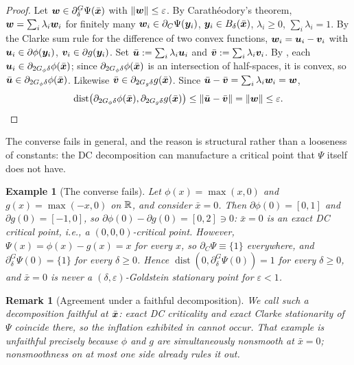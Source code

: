 \documentclass[english]{article}
\newtheorem{example}{Example}[section]
\newtheorem{remark}{Remark}[section]
\begin{document}
\begin{proof}
Let $\bm{w}\in\partial_\delta^G\Psi(\bar{\bm{x}})$ with $\|\bm{w}\|\le\varepsilon$. By
Carath\'eodory's theorem, $\bm{w}=\sum_i\lambda_i\bm{w}_i$ for finitely many
$\bm{w}_i\in\partial_C\Psi(\bm{y}_i)$, $\bm{y}_i\in B_\delta(\bar{\bm{x}})$,
$\lambda_i\ge0$, $\sum_i\lambda_i=1$. By the Clarke sum rule for the
difference of two convex functions, $\bm{w}_i=\bm{u}_i-\bm{v}_i$ with
$\bm{u}_i\in\partial\phi(\bm{y}_i)$, $\bm{v}_i\in\partial g(\bm{y}_i)$. Set
$\bar{\bm{u}}:=\sum_i\lambda_i\bm{u}_i$ and $\bar{\bm{v}}:=\sum_i\lambda_i\bm{v}_i$. By
, each $\bm{u}_i\in\partial_{2G_\phi\delta}\phi(\bar{\bm{x}})$;
since $\partial_{2G_\phi\delta}\phi(\bar{\bm{x}})$ is an intersection of
half-spaces, it is convex, so $\bar{\bm{u}}\in\partial_{2G_\phi\delta}\phi(\bar{\bm{x}})$.
Likewise $\bar{\bm{v}}\in\partial_{2G_g\delta}g(\bar{\bm{x}})$. Since
$\bar{\bm{u}}-\bar{\bm{v}}=\sum_i\lambda_i\bm{w}_i=\bm{w}$,
\[
    \operatorname{dist}\bigl(\partial_{2G_\phi\delta}\phi(\bar{\bm{x}}),\partial_{2G_g\delta}g(\bar{\bm{x}})\bigr)
    \le\|\bar{\bm{u}}-\bar{\bm{v}}\|=\|\bm{w}\|\le\varepsilon.
    \qedhere
\]
\end{proof}

The converse fails in general, and the reason is structural rather than a
looseness of constants: the DC decomposition can manufacture a critical
point that $\Psi$ itself does not have.

\begin{example}[The converse fails]
\label{ex:goldstein-counterexample}
Let $\phi(x)=\max\limits(x,0)$ and $g(x)=\max\limits(-x,0)$ on $\mathbb{R}$, and consider
$\bar x=0$. Then $\partial\phi(0)=[0,1]$ and $\partial g(0)=[-1,0]$, so
$\partial\phi(0)-\partial g(0)=[0,2]\ni0$: $\bar x=0$ is an exact DC
critical point, i.e., a $(0,0,0)$-critical point. However,
$\Psi(x)=\phi(x)-g(x)=x$ for every $x$, so $\partial_C\Psi\equiv\{1\}$
everywhere, and $\partial_\delta^G\Psi(0)=\{1\}$ for every $\delta\ge0$.
Hence $\operatorname{dist}(0,\partial_\delta^G\Psi(0))=1$ for every
$\delta\ge0$, and $\bar x=0$ is never a $(\delta,\varepsilon)$-Goldstein
stationary point for $\varepsilon<1$.
\end{example}

\begin{remark}[Agreement under a faithful decomposition]
\label{rem:faithful-decomposition}
 We call such a
decomposition \emph{faithful} at $\bar{\bm{x}}$: exact DC criticality and exact
Clarke stationarity of $\Psi$ coincide there, so the inflation exhibited in
 cannot occur. That example is unfaithful
precisely because $\phi$ and $g$ are simultaneously nonsmooth at
$\bar x=0$; nonsmoothness on at most one side already rules it out.
\end{remark}
\end{document}
